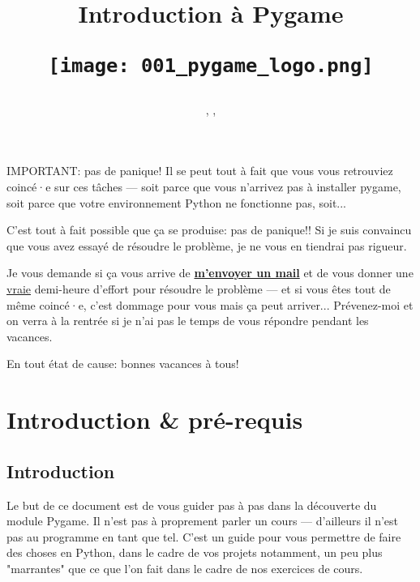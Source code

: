 \documentclass[11pt]{article}
\title
	{\vspace{1cm}
		{\Large
		\textit
			{
				\classe\hspace{0.1cm}
				\textemdash\
				\hspace{0.1cm}
				\themecours
			}
			
		\vspace{1.5cm}
		\huge{Introduction à Pygame}
				 
		\vspace{1cm}
		
		\begin{figure}[H]
			\centering
			\texttt{[image: 001\_pygame\_logo.png]}
		\end{figure}
		
		\vspace{1.5cm}
		}
	}
\author{\etablissement}
\date{
	\auteur,
	\datedoc,
	\footnotesize{\textit{\versiondoc}} 
	\vspace{0.5cm}
	}
\begin{document}
	
	\maketitle
	\thispagestyle{empty}
	\vspace{\baselineskip}
	
	\pagebreak
	
	
	\vspace{3cm}
	\tableofcontents
	
	\vspace{5cm}
	\label{ToutVaBien}
	\begin{MonAlarme}{IMPORTANT: pas de panique!}
		Il se peut tout à fait que vous vous retrouviez coincé·e sur ces tâches --- soit parce que vous n'arrivez pas à installer pygame, soit parce que votre environnement Python ne fonctionne pas, soit...
		
		\vspace{\baselineskip}
		C'est tout à fait possible que ça se produise: pas de panique!! Si je suis convaincu que vous avez essayé de résoudre le problème, je ne vous en tiendrai pas rigueur.
		
		\vspace{\baselineskip}
		Je vous demande si ça vous arrive de \uline{\textbf{m'envoyer un mail}} et de vous donner une \uline{vraie} demi-heure d'effort pour résoudre le problème --- et si vous êtes tout de même coincé·e, c'est dommage pour vous mais ça peut arriver... Prévenez-moi et on verra à la rentrée si je n'ai pas le temps de vous répondre pendant les vacances.
		
		\vspace{\baselineskip}
		En tout état de cause: bonnes vacances à tous!
		
	\end{MonAlarme}
	
	\thispagestyle{empty}
	\vspace{\baselineskip}
	
	\pagebreak
	
	
	\section{Introduction \& pré-requis}
	\subsection*{Introduction}
	Le but de ce document est de vous guider pas à pas dans la découverte du module Pygame. Il n'est pas à proprement parler un cours --- d'ailleurs il n'est pas au programme en tant que tel. C'est un guide pour vous permettre de faire des choses en Python, dans le cadre de vos projets notamment, un peu plus "marrantes" que ce que l'on fait dans le cadre de nos exercices de cours.
	
\end{document}
